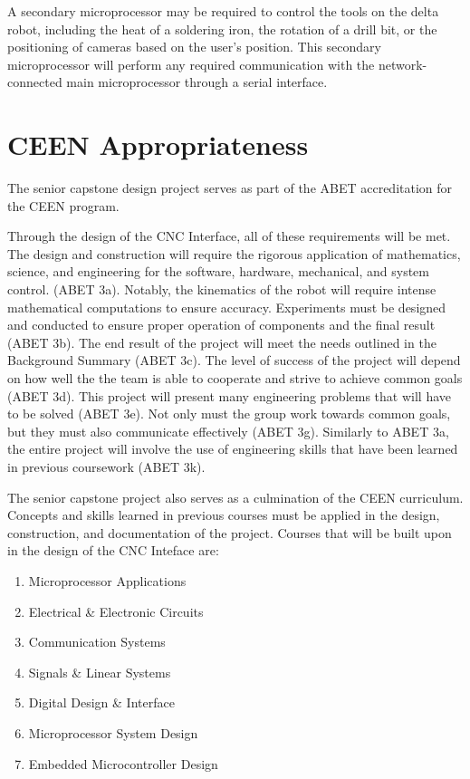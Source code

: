 A secondary microprocessor may be required to control the tools on the delta robot, including the heat of a soldering iron, the rotation of a drill bit, or the positioning of cameras based on the user's position.
This secondary microprocessor will perform any required communication with the network-connected main microprocessor through a serial interface. 

\section{CEEN Appropriateness}
The senior capstone design project serves as part of the ABET accreditation for the CEEN program.

Through the design of the CNC Interface, all of these requirements will be met.
The design and construction will require the rigorous application of mathematics, science, and engineering for the software, hardware, mechanical, and system control. (ABET 3a).
Notably, the kinematics of the robot will require intense mathematical computations to ensure accuracy.
Experiments must be designed and conducted to ensure proper operation of components and the final result (ABET 3b).
The end result of the project will meet the needs outlined in the Background Summary (ABET 3c).
The level of success of the project will depend on how well the the team is able to cooperate and strive to achieve common goals (ABET 3d).
This project will present many engineering problems that will have to be solved (ABET 3e).
Not only must the group work towards common goals, but they must also communicate effectively (ABET 3g).
Similarly to ABET 3a, the entire project will involve the use of engineering skills that have been learned in previous coursework (ABET 3k).

The senior capstone project also serves as a culmination of the CEEN curriculum. Concepts and skills learned in previous courses must be applied in the design, construction, and documentation of the project.
Courses that will be built upon in the design of the CNC Inteface are:
\begin{enumerate} \parskip2pt
	\item Microprocessor Applications
	\item Electrical \& Electronic Circuits
	\item Communication Systems
	\item Signals \& Linear Systems
	\item Digital Design \& Interface
	\item Microprocessor System Design
	\item Embedded Microcontroller Design
\end{enumerate}

